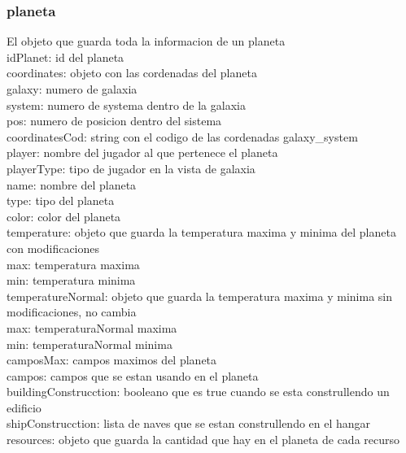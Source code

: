 \documentclass{article}
\newcommand\tab[1][1cm]{\hspace*{#1}}
\begin{document}
        \subsubsection{planeta} El objeto que guarda toda la informacion de un planeta\\
            \tab idPlanet: id del planeta\\
            \tab coordinates: objeto con las cordenadas del planeta\\
            \tab\tab galaxy: numero de galaxia\\
            \tab\tab system: numero de systema dentro de la galaxia\\
            \tab\tab pos: numero de posicion dentro del sistema\\
            \tab coordinatesCod: string con el codigo de las cordenadas galaxy\_system\\
            \tab player: nombre del jugador al que pertenece el planeta\\
            \tab playerType: tipo de jugador en la vista de galaxia\\
            \tab name: nombre del planeta\\
            \tab type: tipo del planeta\\
            \tab color: color del planeta\\
            \tab temperature: objeto que guarda la temperatura maxima y minima del planeta con modificaciones\\
            \tab\tab max: temperatura maxima\\
            \tab\tab min: temperatura minima\\
            \tab temperatureNormal: objeto que guarda la temperatura maxima y minima sin modificaciones, no cambia\\
            \tab\tab max: temperaturaNormal maxima\\
            \tab\tab min: temperaturaNormal minima\\
            \tab camposMax: campos maximos del planeta\\
            \tab campos: campos que se estan usando en el planeta\\
            \tab buildingConstrucction: booleano que es true cuando se esta construllendo un edificio\\
            \tab shipConstrucction: lista de naves que se estan construllendo en el hangar\\
            \tab resources: objeto que guarda la cantidad que hay en el planeta de cada recurso\\
\end{document}
